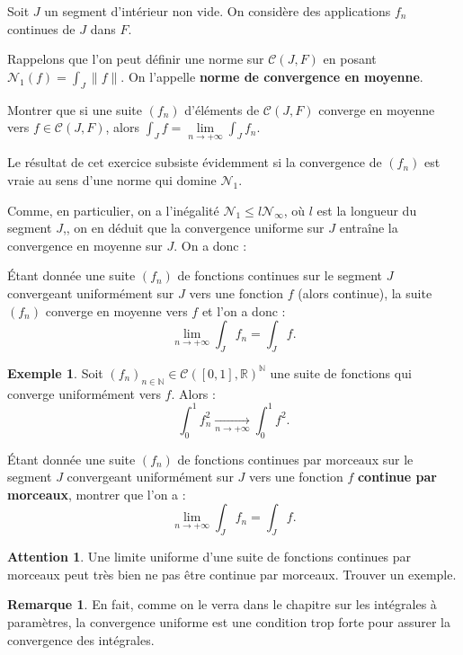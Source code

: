 \documentclass[french]{article}
\newcommand{\N}{\mathbb{N}}
\newcommand{\R}{\mathbb{R}}
\theoremstyle{plain}
\theoremstyle{definition}
\newtheorem*{ex}{Exemple}
\newtheorem*{rmq}{Remarque}
\newtheorem*{attention}{Attention}
\theoremstyle{remark}
\begin{document}
Soit $J$ un segment d'intérieur non vide. On considère des applications $f_n$ continues de $J$ dans $F$.

Rappelons que l'on peut définir une norme sur $\mathcal{C}(J,F)$ en posant $\mathcal{N}_1(f)=\displaystyle\int_J\lVert f\rVert$. On l'appelle \textbf{norme de convergence en moyenne}.

\begin{exo}
	Montrer que si une suite $(f_n)$ d'éléments de $\mathcal{C}(J,F)$ converge en moyenne vers $f\in\mathcal{C}(J,F)$, alors $\displaystyle\int_J f=\underset{n\to+\infty}{\lim}\int_J f_n$.
\end{exo}

Le résultat de cet exercice subsiste évidemment si la convergence de $(f_n)$ est vraie au sens d'une norme qui domine $\mathcal{N}_1$.

Comme, en particulier, on a l'inégalité $\mathcal{N}_1\leqslant l\mathcal{N}_\infty$, où $l$ est la longueur du segment $J$,, on en déduit que la convergence uniforme sur $J$ entraîne la convergence en moyenne sur $J$. On a donc :

\begin{thm}%
	Étant donnée une suite $(f_n)$ de fonctions continues sur le segment $J$ convergeant uniformément sur $J$ vers une fonction $f$ (alors continue), la suite $(f_n)$ converge en moyenne vers $f$ et l'on a donc :
	$$\underset{n\to+\infty}{\lim}\int_Jf_n=\int_Jf.$$
\end{thm}

\begin{ex}
	Soit $(f_n)_{n\in\N}\in\mathcal{C}([0,1],\R)^\N$ une suite de fonctions qui converge uniformément vers $f$. Alors :
	$$\int_{0}^{1}f_n^2\xrightarrow[n\to+\infty]{}\int_{0}^{1}f^2.$$
\end{ex}

\begin{exo}
	Étant donnée une suite $(f_n)$ de fonctions continues par morceaux sur le segment $J$ convergeant uniformément sur $J$ vers une fonction $f$ \textbf{continue par morceaux}, montrer que l'on a :
	$$\underset{n\to+\infty}{\lim}\int_Jf_n=\int_Jf.$$
\end{exo}

\begin{attention}
	Une limite uniforme d'une suite de fonctions continues par morceaux peut très bien ne pas être continue par morceaux. Trouver un exemple.
\end{attention}

\begin{rmq}
	En fait, comme on le verra dans le chapitre sur les intégrales à paramètres, la convergence uniforme est une condition trop forte pour assurer la convergence des intégrales.
\end{rmq}
\end{document}
